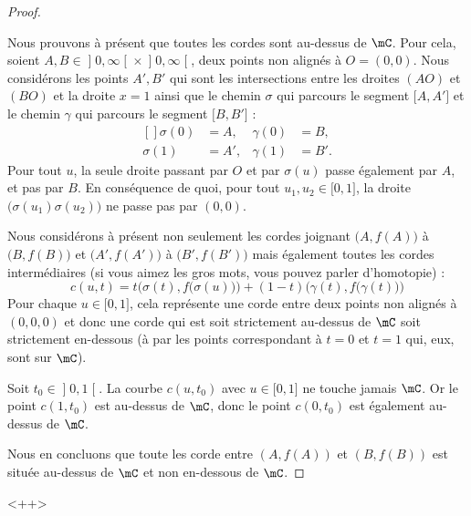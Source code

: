 \begin{proof}
\begin{subproof}
    \end{subproof}

    Nous prouvons à présent que toutes les cordes sont au-dessus de \( \mC\). Pour cela, soient \( A,B\in \mathopen] 0 , \infty \mathclose[\times \mathopen] 0 , \infty \mathclose[\), deux points non alignés à \( O=(0,0)\). Nous considérons les points \( A',B'\) qui sont les intersections entre les droites \( (AO)\) et \( (BO)\) et la droite \( x=1\) ainsi que le chemin \( \sigma\) qui parcours le segment \( \mathopen[ A , A' \mathclose]\) et le chemin \( \gamma\) qui parcours le segment \( \mathopen[ B , B' \mathclose]\) :
    \begin{equation}
        \begin{aligned}[]
            \sigma(0)&=A,&\gamma(0)&=B,\\
            \sigma(1)&=A',&\gamma(1)&=B'.
        \end{aligned}
    \end{equation}
    Pour tout \( u\), la seule droite passant par \( O\) et par \( \sigma(u)\) passe également par \( A\), et pas par \( B\). En conséquence de quoi, pour tout \( u_1,u_2\in \mathopen[ 0 , 1 \mathclose]\), la droite \( \big( \sigma(u_1)\sigma(u_2) \big)\) ne passe pas par \( (0,0)\).

    Nous considérons à présent non seulement les cordes joignant \( \big( A,f(A) \big)\) à \( \big( B,f(B) \big)\) et \( \big( A',f(A') \big)\) à \( \big( B',f(B') \big)\) mais également toutes les cordes intermédiaires (si vous aimez les gros mots, vous pouvez parler d'homotopie) :
    \begin{equation}
        c(u,t)=t\Big( \sigma(t), f\big(\sigma(u)\big) \Big)+(1-t)\Big( \gamma(t),f\big( \gamma(t) \big) \Big)
    \end{equation}
    Pour chaque \( u\in\mathopen[ 0 , 1 \mathclose]\), cela représente une corde entre deux points non alignés à \( (0,0,0)\) et donc une corde qui est soit strictement au-dessus de \( \mC\) soit strictement en-dessous (à par les points correspondant à \( t=0\) et \( t=1\) qui, eux, sont sur \( \mC\)).

    Soit \( t_0\in \mathopen] 0 , 1 \mathclose[\). La courbe \( c(u,t_0)\) avec \( u\in\mathopen[ 0 , 1 \mathclose]\) ne touche jamais \( \mC\). Or le point \( c(1,t_0)\) est au-dessus de \( \mC\), donc le point \( c(0,t_0)\) est également au-dessus de \( \mC\).

    Nous en concluons que toute les corde entre \( (A,f(A)) \) et \( (B,f(B))\) est située au-dessus de \( \mC\) et non en-dessous de \( \mC\).

\end{proof}
<++>

